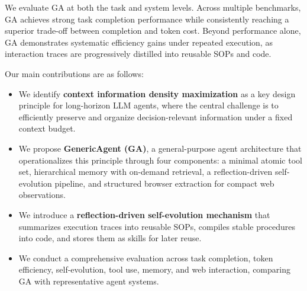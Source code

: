 We evaluate GA at both the task and system levels. 
Across multiple benchmarks, GA achieves strong task completion performance while consistently reaching a superior trade-off between completion and token cost. 
Beyond performance alone, GA demonstrates systematic efficiency gains under repeated execution, as interaction traces are progressively distilled into reusable SOPs and code. 

Our main contributions are as follows:
\begin{itemize}[leftmargin=*]

\item We identify \textbf{context information density maximization} as a key design principle for long-horizon LLM agents, where the central challenge is to efficiently preserve and organize decision-relevant information under a fixed context budget.

\item We propose \textbf{GenericAgent (GA)}, a general-purpose agent architecture that operationalizes this principle through four components: a minimal atomic tool set, hierarchical memory with on-demand retrieval, a reflection-driven self-evolution pipeline, and structured browser extraction for compact web observations.

\item We introduce a \textbf{reflection-driven self-evolution mechanism} that summarizes execution traces into reusable SOPs, compiles stable procedures into code, and stores them as skills for later reuse.

\item We conduct a comprehensive evaluation across task completion, token efficiency, self-evolution, tool use, memory, and web interaction, comparing GA with representative agent systems.
\end{itemize}
